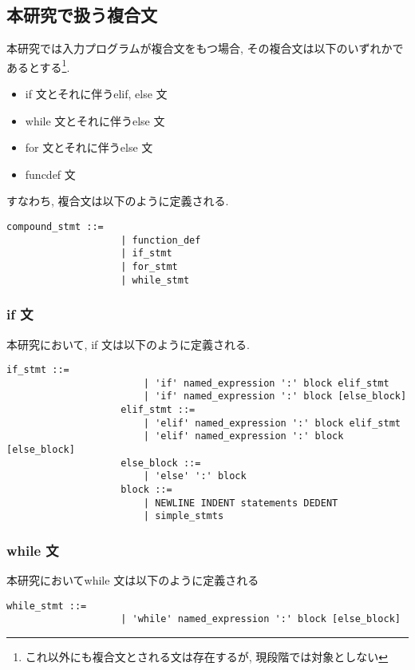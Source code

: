 \documentclass{jlreq}
\begin{document}
        \subsection{本研究で扱う複合文}
            本研究では入力プログラムが複合文をもつ場合, その複合文は以下のいずれかであるとする\footnote{これ以外にも複合文とされる文は存在するが, 現段階では対象としない}.
            \begin{itemize}
                \item if 文とそれに伴うelif, else 文
                \item while 文とそれに伴うelse 文
                \item for 文とそれに伴うelse 文
                \item funcdef 文
            \end{itemize}
            すなわち, 複合文は以下のように定義される.
            \begin{lstlisting}[caption=式の定義]
                compound_stmt ::=
                    | function_def
                    | if_stmt
                    | for_stmt
                    | while_stmt
            \end{lstlisting}
            \subsubsection{if 文}
                本研究において, if 文は以下のように定義される.
                \begin{lstlisting}[caption=if 文の定義]
                    if_stmt ::=
                        | 'if' named_expression ':' block elif_stmt 
                        | 'if' named_expression ':' block [else_block] 
                    elif_stmt ::=
                        | 'elif' named_expression ':' block elif_stmt 
                        | 'elif' named_expression ':' block [else_block] 
                    else_block ::=
                        | 'else' ':' block
                    block ::=
                        | NEWLINE INDENT statements DEDENT 
                        | simple_stmts
                \end{lstlisting}
            \subsubsection{while 文}
            本研究においてwhile 文は以下のように定義される
            \begin{lstlisting}[caption=while 文の定義]
                while_stmt ::=
                    | 'while' named_expression ':' block [else_block]
            \end{lstlisting}
\end{document}
